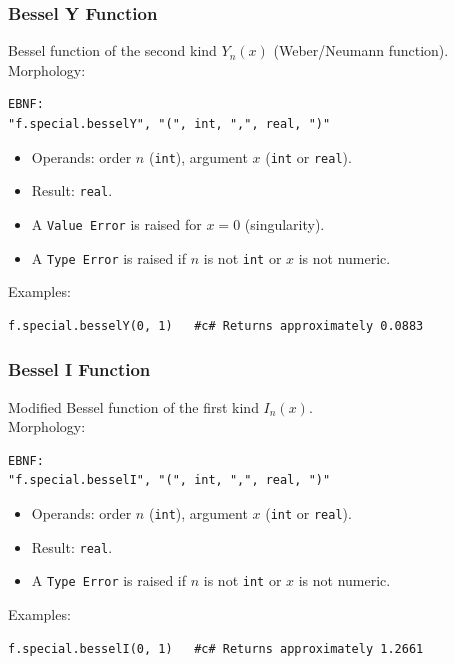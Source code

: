 \subsubsection{Bessel Y Function}
Bessel function of the second kind $Y_n(x)$ (Weber/Neumann function). \\
Morphology:
\begin{verbatim}
EBNF:
"f.special.besselY", "(", int, ",", real, ")"
\end{verbatim}
\begin{itemize}
\item Operands: order $n$ (\texttt{int}), argument $x$ (\texttt{int} or \texttt{real}).
\item Result: \texttt{real}.
\item A \texttt{Value Error} is raised for $x = 0$ (singularity).
\item A \texttt{Type Error} is raised if $n$ is not \texttt{int} or $x$ is not numeric.
\end{itemize}
Examples:
\begin{verbatim}
f.special.besselY(0, 1)   #c# Returns approximately 0.0883
\end{verbatim}

\subsubsection{Bessel I Function}
Modified Bessel function of the first kind $I_n(x)$. \\
Morphology:
\begin{verbatim}
EBNF:
"f.special.besselI", "(", int, ",", real, ")"
\end{verbatim}
\begin{itemize}
\item Operands: order $n$ (\texttt{int}), argument $x$ (\texttt{int} or \texttt{real}).
\item Result: \texttt{real}.
\item A \texttt{Type Error} is raised if $n$ is not \texttt{int} or $x$ is not numeric.
\end{itemize}
Examples:
\begin{verbatim}
f.special.besselI(0, 1)   #c# Returns approximately 1.2661
\end{verbatim}

